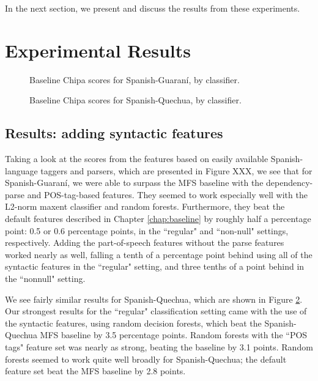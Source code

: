 In the next section, we present and discuss the results from these experiments.

\section{Experimental Results} 

\begin{figure}
  \caption{Baseline Chipa scores for Spanish-Guaraní, by classifier.}
  \label{fig:esgnresults:monolingual}
\end{figure}

\begin{figure}
  \caption{Baseline Chipa scores for Spanish-Quechua, by classifier.}
  \label{fig:esquresults:monolingual}
\end{figure}

\subsection{Results: adding syntactic features}
Taking a look at the scores from the features based on easily available
Spanish-language taggers and parsers, which are presented in Figure XXX, we see
that for Spanish-Guaraní, we were able to surpass the MFS baseline with the
dependency-parse and POS-tag-based features. They seemed to work especially
well with the L2-norm maxent classifier and random forests. Furthermore, they
beat the default features described in Chapter \ref{chap:baseline} by roughly
half a percentage point: 0.5 or 0.6 percentage points, in the ``regular" and
``non-null" settings, respectively. Adding the part-of-speech features without
the parse features worked nearly as well, falling a tenth of a percentage point
behind using all of the syntactic features in the ``regular" setting, and three
tenths of a point behind in the ``nonnull" setting.

We see fairly similar results for Spanish-Quechua, which are shown in Figure
\ref{fig:esquresults:monolingual}. Our strongest results for the ``regular"
classification setting came with the use of the syntactic features, using
random decision forests, which beat the Spanish-Quechua MFS baseline by 3.5
percentage points. Random forests with the ``POS tags" feature set was nearly
as strong, beating the baseline by 3.1 points. Random forests seemed to work
quite well broadly for Spanish-Quechua; the default feature set beat the
MFS baseline by 2.8 points.

